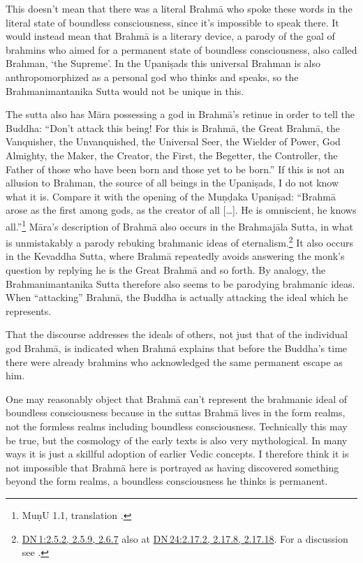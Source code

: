 \documentclass[10pt, openright]{book}
\begin{document}
This doesn’t mean that there was a literal Brahmā who spoke these words in the literal state of boundless consciousness, since it’s impossible to speak there. It would instead mean that Brahmā is a literary device, a parody of the goal of brahmins who aimed for a permanent state of boundless consciousness, also called Brahman, ‘the Supreme’. In the Upaniṣads this universal Brahman is also anthropomorphized as a personal god who thinks and speaks, so the Brahmanimantanika Sutta would not be unique in this.


The sutta also has Māra possessing a god in Brahmā’s retinue in order to tell the Buddha: “Don’t attack this being! For this is Brahmā, the Great Brahmā, the Vanquisher, the Unvanquished, the Universal Seer, the Wielder of Power, God Almighty, the Maker, the Creator, the First, the Begetter, the Controller, the Father of those who have been born and those yet to be born.” If this is not an allusion to Brahman, the source of all beings in the Upaniṣads, I do not know what it is. Compare it with the opening of the Muṇḍaka Upaniṣad: “Brahmā arose as the first among gods, as the creator of all […]. He is omniscient, he knows all.”\footnote {MuṇU 1.1, translation \cite{Olivelle}.} Māra’s description of Brahmā also occurs in the Brahmajāla Sutta, in what is unmistakably a parody rebuking brahmanic ideas of eternalism.\footnote {\href{https://suttacentral.net/dn1/en/sujato\#2.5.2}{DN 1:2.5.2, 2.5.9, 2.6.7} also at \href{https://suttacentral.net/dn24/en/sujato\#2.17.2}{DN 24:2.17.2, 2.17.8, 2.17.18}. For a discussion see \cite{Sunyo 2023}.} It also occurs in the Kevaddha Sutta, where Brahmā repeatedly avoids answering the monk’s question by replying he is the Great Brahmā and so forth. By analogy, the Brahmanimantanika Sutta therefore also seems to be parodying brahmanic ideas. When “attacking” Brahmā, the Buddha is actually attacking the ideal which he represents.


That the discourse addresses the ideals of others, not just that of the individual god Brahmā, is indicated when Brahmā explains that before the Buddha’s time there were already brahmins who acknowledged the same permanent escape as him.


One may reasonably object that Brahmā can’t represent the brahmanic ideal of boundless consciousness because in the suttas Brahmā lives in the form realms, not the formless realms including boundless consciousness. Technically this may be true, but the cosmology of the early texts is also very mythological. In many ways it is just a skillful adoption of earlier Vedic concepts. I therefore think it is not impossible that Brahmā here is portrayed as having discovered something beyond the form realms, a boundless consciousness he thinks is permanent.
\end{document}
